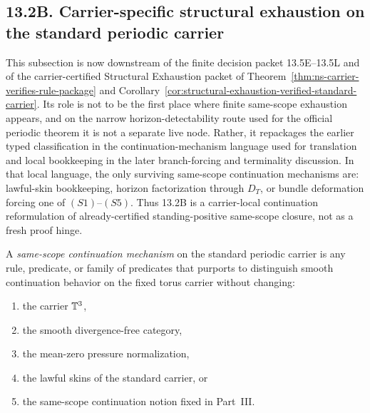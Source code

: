 \subsection*{13.2B. Carrier-specific structural exhaustion on the standard periodic carrier}

This subsection is now downstream of the finite decision packet 13.5E--13.5L and of the carrier-certified
Structural Exhaustion packet of Theorem~\ref{thm:ns-carrier-verifies-rule-package} and
Corollary~\ref{cor:structural-exhaustion-verified-standard-carrier}. Its role is not to be the first
place where finite same-scope exhaustion appears, and on the narrow horizon-detectability route used
for the official periodic theorem it is not a separate live node. Rather, it repackages the earlier
typed classification in the continuation-mechanism language used for translation and local bookkeeping
in the later branch-forcing and terminality discussion. In that local language, the only surviving
same-scope continuation mechanisms are: lawful-skin bookkeeping, horizon factorization through $D_T$,
or bundle deformation forcing one of $(S1)$--$(S5)$. Thus 13.2B is a carrier-local
continuation reformulation of already-certified standing-positive same-scope closure, not as a fresh
proof hinge.

\begin{manualdefinition}
\label{def:same-scope-continuation-mechanism}
A \emph{same-scope continuation mechanism} on the standard periodic carrier is any rule,
predicate, or family of predicates that purports to distinguish smooth continuation behavior on the
fixed torus carrier without changing:
\begin{enumerate}[label=(\roman*), leftmargin=2.2em]
\item the carrier $\mathbb{T}^3$,
\item the smooth divergence-free category,
\item the mean-zero pressure normalization,
\item the lawful skins of the standard carrier, or
\item the same-scope continuation notion fixed in Part~III.
\end{enumerate}
\end{manualdefinition}

